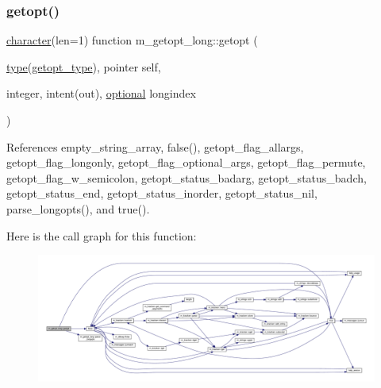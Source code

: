\subsubsection{\texorpdfstring{getopt()}{getopt()}}
{\footnotesize\ttfamily \hyperlink{option__stopwatch_83_8txt_abd4b21fbbd175834027b5224bfe97e66}{character}(len=1) function m\+\_\+getopt\+\_\+long\+::getopt (\begin{DoxyParamCaption}\item[{\hyperlink{stop__watch_83_8txt_a70f0ead91c32e25323c03265aa302c1c}{type}(\hyperlink{structm__getopt__long_1_1getopt__type}{getopt\+\_\+type}), pointer}]{self,  }\item[{integer, intent(out), \hyperlink{option__stopwatch_83_8txt_aa4ece75e7acf58a4843f70fe18c3ade5}{optional}}]{longindex }\end{DoxyParamCaption})}



References empty\+\_\+string\+\_\+array, false(), getopt\+\_\+flag\+\_\+allargs, getopt\+\_\+flag\+\_\+longonly, getopt\+\_\+flag\+\_\+optional\+\_\+args, getopt\+\_\+flag\+\_\+permute, getopt\+\_\+flag\+\_\+w\+\_\+semicolon, getopt\+\_\+status\+\_\+badarg, getopt\+\_\+status\+\_\+badch, getopt\+\_\+status\+\_\+end, getopt\+\_\+status\+\_\+inorder, getopt\+\_\+status\+\_\+nil, parse\+\_\+longopts(), and true().

Here is the call graph for this function\+:
\nopagebreak
\begin{figure}[H]
\begin{center}
\leavevmode
\includegraphics[width=350pt]{namespacem__getopt__long_ae12838b4ea1d076090a8bbd9f05000ef_cgraph}
\end{center}
\end{figure}
\mbox{\label{namespacem__getopt__long_a7bd7b84d1aeda27b57f33b81a93ef1c1}} 
